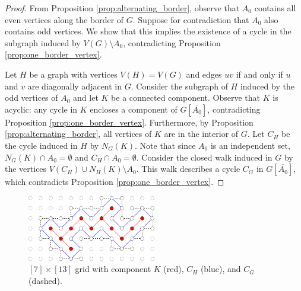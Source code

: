 \begin{proof}
From Proposition \ref{prop:alternating_border}, observe that $A_0$ contains all even vertices along the border of $G$. Suppose for contradiction that $A_0$ also contains odd vertices. We show that this implies the existence of a cycle in the subgraph induced by $V(G) \setminus A_0$, contradicting Proposition \ref{prop:one_border_vertex}. 

Let $H$ be a graph with vertices $V(H) = V(G)$ and edges $uv$ if and only if $u$ and $v$ are diagonally adjacent in $G$. Consider the subgraph of $H$ induced by the odd vertices of $A_0$ and let $K$ be a connected component. Observe that $K$ is acyclic: any cycle in $K$ encloses a component of $G[\overline{A_0}]$, contradicting Proposition \ref{prop:one_border_vertex}. Furthermore, by Proposition \ref{prop:alternating_border}, all vertices of $K$ are in the interior of $G$. Let $C_H$ be the cycle induced in $H$ by $N_G(K)$. Note that since $A_0$ is an independent set, $N_G(K) \cap A_0 = \emptyset$ and $C_H \cap A_0 = \emptyset$. Consider the closed walk induced in $G$ by the vertices $V(C_H) \cup N_H(K) \setminus A_0$. This walk describes a cycle $C_G$ in $G[\overline{A_0}]$, which contradicts Proposition \ref{prop:one_border_vertex}.
 \end{proof}

\begin{figure}[]
\centering
\includegraphics[width=0.5\textwidth]{figures/6/monochromatic.pdf}
\caption{$[7] \times [13]$ grid with component $K$ (red), $C_H$ (blue), and $C_G$ (dashed).}
\label{fig:border}
\end{figure} 

